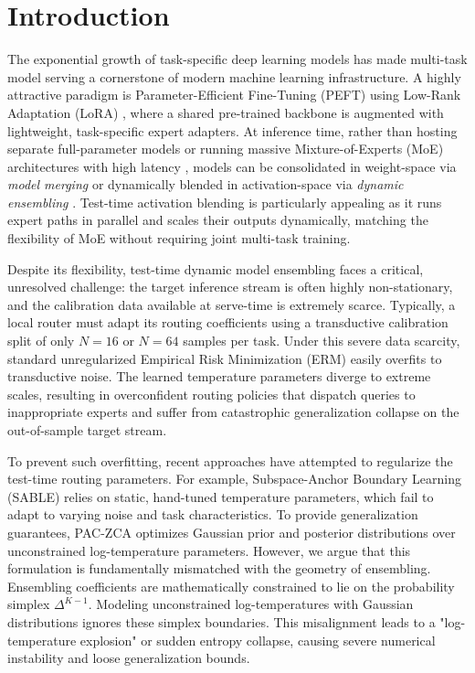 \section{Introduction}
\label{sec:intro}

The exponential growth of task-specific deep learning models has made multi-task model serving a cornerstone of modern machine learning infrastructure. A highly attractive paradigm is Parameter-Efficient Fine-Tuning (PEFT) using Low-Rank Adaptation (LoRA) \cite{hu2021lora}, where a shared pre-trained backbone is augmented with lightweight, task-specific expert adapters. At inference time, rather than hosting separate full-parameter models or running massive Mixture-of-Experts (MoE) architectures with high latency \cite{shazeer2017moe, fedus2021switch}, models can be consolidated in weight-space via \emph{model merging} \cite{wortsman2022model, ilharco2022editing, yadav2023ties} or dynamically blended in activation-space via \emph{dynamic ensembling} \cite{sable2025, regcalmerge2025}. Test-time activation blending is particularly appealing as it runs expert paths in parallel and scales their outputs dynamically, matching the flexibility of MoE without requiring joint multi-task training.

Despite its flexibility, test-time dynamic model ensembling faces a critical, unresolved challenge: the target inference stream is often highly non-stationary, and the calibration data available at serve-time is extremely scarce. Typically, a local router must adapt its routing coefficients using a transductive calibration split of only $N = 16$ or $N = 64$ samples per task. Under this severe data scarcity, standard unregularized Empirical Risk Minimization (ERM) easily overfits to transductive noise. The learned temperature parameters diverge to extreme scales, resulting in overconfident routing policies that dispatch queries to inappropriate experts and suffer from catastrophic generalization collapse on the out-of-sample target stream.

To prevent such overfitting, recent approaches have attempted to regularize the test-time routing parameters. For example, Subspace-Anchor Boundary Learning (SABLE) \cite{sable2025} relies on static, hand-tuned temperature parameters, which fail to adapt to varying noise and task characteristics. To provide generalization guarantees, PAC-ZCA \cite{paczca2026} optimizes Gaussian prior and posterior distributions over unconstrained log-temperature parameters. However, we argue that this formulation is fundamentally mismatched with the geometry of ensembling. Ensembling coefficients are mathematically constrained to lie on the probability simplex $\Delta^{K-1}$. Modeling unconstrained log-temperatures with Gaussian distributions ignores these simplex boundaries. This misalignment leads to a "log-temperature explosion" or sudden entropy collapse, causing severe numerical instability and loose generalization bounds.

